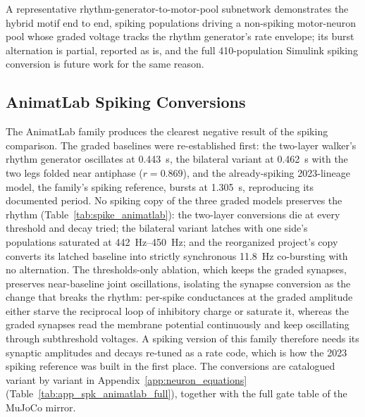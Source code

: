 A representative rhythm-generator-to-motor-pool subnetwork demonstrates the hybrid motif end to end, spiking populations driving a non-spiking motor-neuron pool whose graded voltage tracks the rhythm generator's rate envelope; its burst alternation is partial, reported as is, and the full 410-population Simulink spiking conversion is future work for the same reason.

\subsection{AnimatLab Spiking Conversions}

The AnimatLab family produces the clearest negative result of the spiking comparison. The graded baselines were re-established first: the two-layer walker's rhythm generator oscillates at \qty{0.443}{\second}, the bilateral variant at \qty{0.462}{\second} with the two legs folded near antiphase ($r = 0.869$), and the already-spiking 2023-lineage model, the family's spiking reference, bursts at \qty{1.305}{\second}, reproducing its documented period. No spiking copy of the three graded models preserves the rhythm (Table~\ref{tab:spike_animatlab}): the two-layer conversions die at every threshold and decay tried; the bilateral variant latches with one side's populations saturated at \qty{442}{\hertz}--\qty{450}{\hertz}; and the reorganized project's copy converts its latched baseline into strictly synchronous \qty{11.8}{\hertz} co-bursting with no alternation. The thresholds-only ablation, which keeps the graded synapses, preserves near-baseline joint oscillations, isolating the synapse conversion as the change that breaks the rhythm: per-spike conductances at the graded amplitude either starve the reciprocal loop of inhibitory charge or saturate it, whereas the graded synapses read the membrane potential continuously and keep oscillating through subthreshold voltages. A spiking version of this family therefore needs its synaptic amplitudes and decays re-tuned as a rate code, which is how the 2023 spiking reference was built in the first place. The conversions are catalogued variant by variant in Appendix~\ref{app:neuron_equations} (Table~\ref{tab:app_spk_animatlab_full}), together with the full gate table of the MuJoCo mirror.

